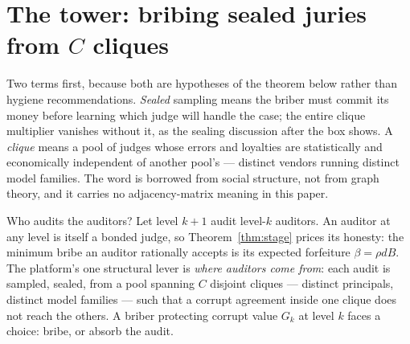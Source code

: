 \documentclass[11pt,a4paper]{article}
\begin{document}


\section{The tower: bribing sealed juries from $C$ cliques}\label{sec:tower}
Two terms first, because both are hypotheses of the theorem below rather than hygiene recommendations. \emph{Sealed} sampling means the briber must commit its money before learning which judge will handle the case; the entire clique multiplier vanishes without it, as the sealing discussion after the box shows. A \emph{clique} means a pool of judges whose errors and loyalties are statistically and economically independent of another pool's --- distinct vendors running distinct model families. The word is borrowed from social structure, not from graph theory, and it carries no adjacency-matrix meaning in this paper.

Who audits the auditors? Let level $k{+}1$ audit level-$k$ auditors. An auditor at any level is itself a bonded judge, so Theorem~\ref{thm:stage} prices its honesty: the minimum bribe an auditor rationally accepts is its expected forfeiture $\beta = \rho d B$. The platform's one structural lever is \emph{where auditors come from}: each audit is sampled, sealed, from a pool spanning $C$ disjoint cliques --- distinct principals, distinct model families --- such that a corrupt agreement inside one clique does not reach the others. A briber protecting corrupt value $G_k$ at level $k$ faces a choice: bribe, or absorb the audit.
\end{document}
